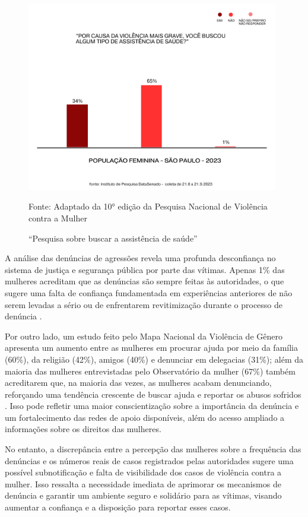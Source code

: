 \documentclass[
    article,			%
    12pt,				%
    oneside,            %
    a4paper,			%
    english,			%
    brazil,				%
    ]{abntex2}
\begin{document}
 \begin{figure}[ht]
    \centering
    \includegraphics[width=11cm]{buscou assistencia de saude.png}\\
    \caption{“Pesquisa sobre buscar a assistência de saúde”}
        Fonte: Adaptado da 10° edição da Pesquisa Nacional de Violência contra a Mulher
    \label{fig:infografico}
\end{figure}

    A análise das denúncias de agressões revela uma profunda desconfiança no sistema de justiça e segurança pública por parte das vítimas. Apenas 1\% das mulheres acreditam que as denúncias são sempre feitas às autoridades, o que sugere uma falta de confiança fundamentada em experiências anteriores de não serem levadas a sério ou de enfrentarem revitimização durante o processo de denúncia \cite{senadoSP_2023}.

    Por outro lado, um estudo feito pelo Mapa Nacional da Violência de Gênero apresenta um aumento entre as mulheres em procurar ajuda por meio da família (60\%), da religião (42\%), amigos (40\%) e denunciar em delegacias (31\%); além da maioria das mulheres entrevistadas pelo Observatório da mulher (67\%) também acreditarem que, na maioria das vezes, as mulheres acabam denunciando, reforçando uma tendência crescente de buscar ajuda e reportar os abusos sofridos \cite{senadoSP_2023}. Isso pode refletir uma maior conscientização sobre a importância da denúncia e um fortalecimento das redes de apoio disponíveis, além do acesso ampliado a informações sobre os direitos das mulheres. 

    No entanto, a discrepância entre a percepção das mulheres sobre a frequência das denúncias e os números reais de casos registrados pelas autoridades sugere uma possível subnotificação e falta de visibilidade dos casos de violência contra a mulher. Isso ressalta a necessidade imediata de aprimorar os mecanismos de denúncia e garantir um ambiente seguro e solidário para as vítimas, visando aumentar a confiança e a disposição para reportar esses casos.
\end{document}

